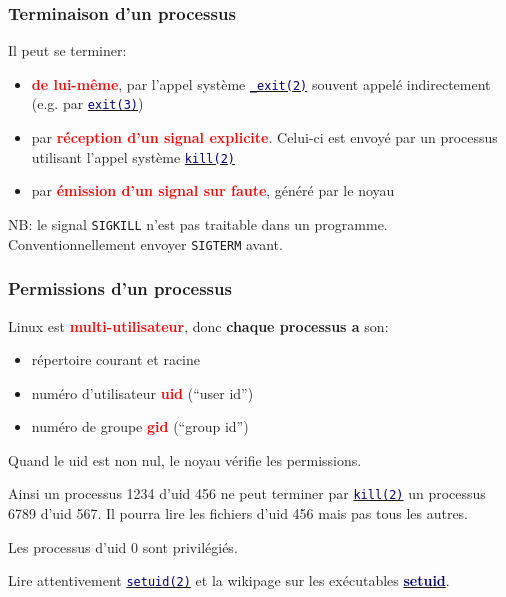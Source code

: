 \documentclass[lualatex,11pt,a4paper,svgnames,french]{beamer}
\newcommand{\clbrougras}[1]{{\textcolor{Red}{\textbf{#1}}}}
\begin{document}
\begin{frame}\frametitle{Terminaison d'un processus}
  Il peut se terminer:
  \begin{itemize}
    \item  \clbrougras{de lui-même}, par l'appel système 
  {\href{https://man7.org/linux/man-pages/man2/_exit.2.html}{\texttt{\textcolor{Navy}{\_exit(2)}}}} souvent appelé indirectement (e.g. par 
  {\href{https://man7.org/linux/man-pages/man3/exit.3.html}{\texttt{\textcolor{Navy}{exit(3)}}}})
  \item par  \clbrougras{réception d'un signal explicite}. Celui-ci est envoyé par un processus utilisant l'appel système
  {\href{https://man7.org/linux/man-pages/man2/kill.2.html}{\texttt{\textcolor{Navy}{kill(2)}}}}
  \item par \clbrougras{émission d'un signal sur faute}, généré par le noyau
    {}
  \end{itemize}
  
  \bigskip

  NB: le signal \texttt{SIGKILL} n'est pas traitable dans un
  programme. Conventionnellement envoyer \texttt{SIGTERM} avant.
\end{frame}
\begin{frame}\frametitle{Permissions d'un processus}

  Linux est \clbrougras{multi-utilisateur}, donc \textbf{chaque
    processus a} son:

  \begin{itemize}
  \item répertoire courant et racine
  \item numéro d'utilisateur \clbrougras{uid} (``user id'')
  \item numéro de groupe \clbrougras{gid} (``group id'')
  \end{itemize}

  \smallskip
  
  Quand le uid est non nul, le noyau vérifie les permissions.

\medskip
Ainsi un
processus 1234 d'uid 456 ne peut terminer par
{\href{https://man7.org/linux/man-pages/man2/kill.2.html}{\texttt{\textcolor{Navy}{kill(2)}}}}
  un processus 6789 d'uid 567.  Il pourra lire les fichiers d'uid 456
  mais pas tous les autres.

  \medskip

  Les processus d'uid 0 sont privilégiés.

\medskip
  Lire attentivement
  {\href{https://man7.org/linux/man-pages/man2/setuid.2.html}{\texttt{\textcolor{Navy}{setuid(2)}}}}
  et la wikipage sur les exécutables 
{\href{https://fr.wikipedia.org/wiki/Setuid}{\textbf{\textcolor{Navy}{setuid}}}}.
  
\end{frame}
\end{document}
